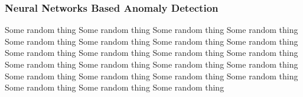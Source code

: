 \subsubsection{Neural Networks Based Anomaly Detection}

Some random thing Some random thing Some random thing Some random thing Some random thing Some random thing Some random thing Some random thing Some random thing Some random thing Some random thing Some random thing Some random thing Some random thing Some random thing Some random thing Some random thing Some random thing Some random thing Some random thing Some random thing Some random thing Some random thing  \newpage

